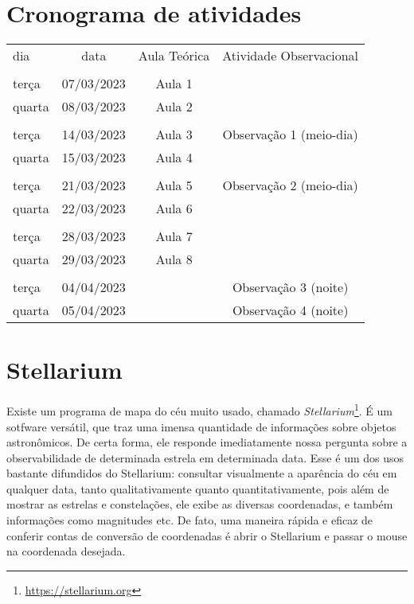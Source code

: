 \section{Cronograma de atividades}

\begin{table}[h]
\begin{center}
\begin{tabular}{lccc}
\rowcolor{mybeige!80!gray}  
dia & data & Aula Teórica & Atividade Observacional \\
&&&\\[-0.2em]
\rowcolor{mybeige}
terça              & 07/03/2023 & Aula 1 & \\
\rowcolor{mybeige}
quarta             & 08/03/2023 & Aula 2 & \\
&&&\\[-0.2em]
\rowcolor{mybeige} 
terça              & 14/03/2023 & Aula 3 & Observação 1 (meio-dia)\\
\rowcolor{mybeige} 
quarta             & 15/03/2023 & Aula 4 & \\
&&&\\[-0.2em]
\rowcolor{mybeige}
terça              & 21/03/2023 & Aula 5 & Observação 2 (meio-dia)\\
\rowcolor{mybeige}
quarta             & 22/03/2023 & Aula 6 & \\
&&&\\[-0.2em]
\rowcolor{mybeige} 
terça              & 28/03/2023 & Aula 7 & \\
\rowcolor{mybeige} 
quarta             & 29/03/2023 & Aula 8 & \\
&&&\\[-0.2em]
\rowcolor{mybeige} 
terça              & 04/04/2023 & & Observação 3 (noite)\\
\rowcolor{mybeige} 
quarta             & 05/04/2023 & & Observação 4 (noite) \\        
\end{tabular}
\end{center}
\end{table}

\newpage
\section{Stellarium}

Existe um programa de mapa do céu muito usado, chamado \textit{Stellarium}\footnote{\url{https://stellarium.org}}. É um sotfware versátil, que traz uma imensa quantidade de informações sobre objetos astronômicos. De certa forma, ele responde imediatamente nossa pergunta sobre a observabilidade de determinada estrela em determinada data. Esse é um dos usos bastante difundidos do Stellarium: consultar visualmente a aparência do céu em qualquer data, tanto qualitativamente quanto quantitativamente, pois além de mostrar as estrelas e constelações, ele exibe as diversas coordenadas, e também informações como magnitudes etc. De fato, uma maneira rápida e eficaz de conferir contas de conversão de coordenadas é abrir o Stellarium e passar o mouse na coordenada desejada.

